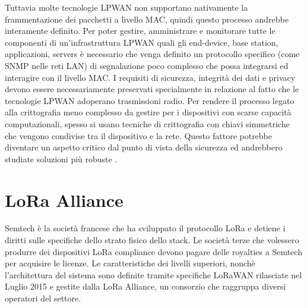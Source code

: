 \documentclass[12pt,a4paper,openright,twoside]{report}
\begin{document}
Tuttavia molte tecnologie LPWAN non supportano nativamente la frammentazione dei pacchetti a livello MAC, quindi questo processo andrebbe interamente definito. 
Per poter gestire, amministrare e monitorare tutte le componenti di un'infrastruttura LPWAN quali gli end-device, base station, applicazioni, servers \`e necessario che venga definito un protocollo specifico (come SNMP nelle reti LAN) di segnalazione poco complesso che possa integrarsi ed interagire con il livello MAC. 					
I requisiti di sicurezza, integrit\`a dei dati e privacy devono essere necessariamente preservati specialmente in relazione al fatto che le tecnologie LPWAN adoperano trasmissioni radio.
Per rendere il processo legato alla crittografia meno complesso da gestire per i dispositivi con scarse capacit\`a computazionali, spesso si usano tecniche di crittografia con chiavi simmetriche che vengono condivise tra il dispositivo e la rete. Questo fattore potrebbe diventare un aspetto critico dal punto di vista della sicurezza ed andrebbero studiate soluzioni pi\`u robuste \cite{K2}.

\section{LoRa Alliance}
Semtech \`e la societ\`a francese che ha sviluppato il protocollo LoRa e detiene i diritti sulle specifiche dello strato fisico dello stack. Le societ\`a terze che volessero produrre dei dispositivi LoRa compliance devono pagare delle royalties a Semtech per acquisire le licenze. 
Le caratteristiche dei livelli superiori, nonch\`e l'architettura del sistema sono definite tramite specifiche LoRaWAN rilasciate nel Luglio 2015 e gestite dalla LoRa Alliance, un consorzio che raggruppa diversi operatori del settore.  
\end{document}
